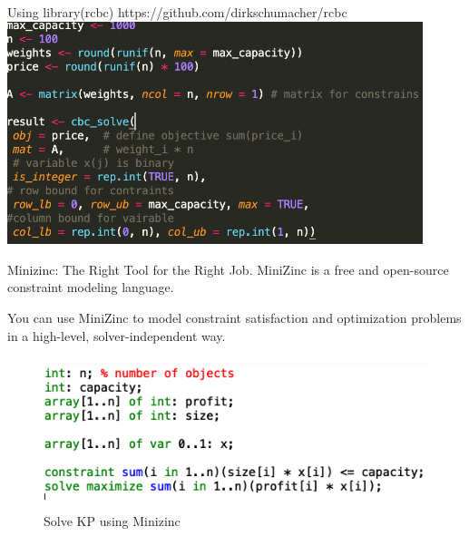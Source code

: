 \documentclass[xcolor=dvipsnames,aspectratio=169]{beamer}
\begin{document}
\begin{frame}{Using library(rcbc)}
https://github.com/dirkschumacher/rcbc
 \includegraphics[height =6.5cm]{knapsack.png}
\end{frame}



\begin{frame}{Minizinc: The Right Tool for the Right Job.}
MiniZinc is a free and open-source constraint modeling language.

You can use MiniZinc to model constraint 
satisfaction and optimization problems in a 
high-level, solver-independent way.

\begin{figure}
    \centering
\includegraphics[height =4.4cm]{Minizinc_knapsack.png}
    \caption{Solve KP using Minizinc}
    \label{fig:minizinc}
\end{figure}

\end{frame}
\end{document}
